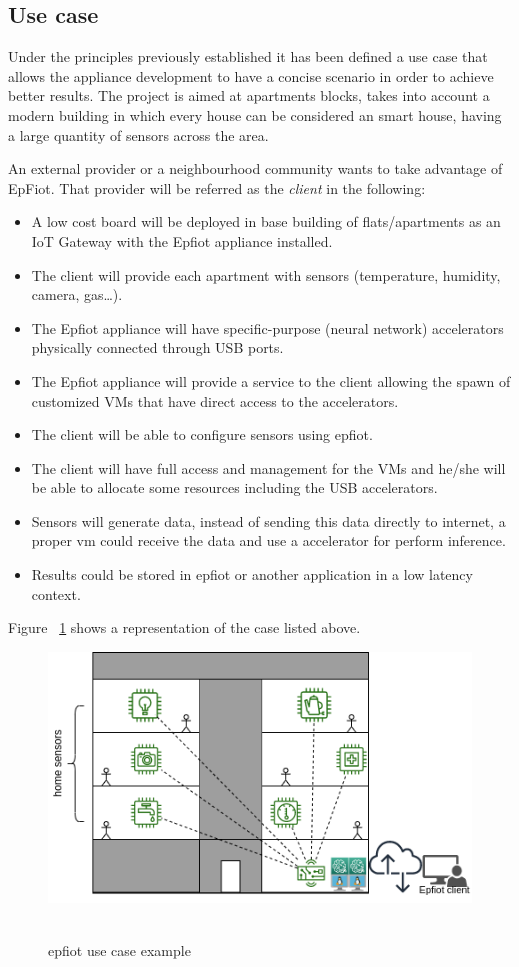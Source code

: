 \subsection{Use case}
\label{makereference1.2.1}
Under the principles previously established it has been defined a use case that allows the appliance development to have a concise scenario in order to achieve better results. The project is aimed at apartments blocks, takes into account a modern building in which every house can be considered an smart house, having a large quantity of sensors across the area.

An external provider or a neighbourhood community wants to take advantage of EpFiot. That provider will be referred as the {\em client} in the following:
\begin{itemize}
  \item A low cost board will be deployed in base building of flats/apartments as an IoT Gateway with the Epfiot appliance installed.
  \item The client will provide each apartment with sensors (temperature, humidity, camera, gas\ldots).
  \item The Epfiot appliance will have specific-purpose (neural network) accelerators physically connected through USB ports.
  \item The Epfiot appliance will provide a service to the client allowing the spawn of customized VMs that have direct access to the accelerators.
  \item The client will be able to configure sensors using epfiot.
  \item The client will have full access and management for the VMs and he/she will be able to allocate some resources including the USB accelerators.
  \item Sensors will generate data, instead of sending this data directly to internet, a proper vm could receive the data and use a accelerator for perform inference.
  \item Results could be stored in epfiot or another application in a low latency context.
\end{itemize}

Figure ~\ref{figure1.2} shows a representation of the case listed above.

\begin{figure}[h]%
    \includegraphics[width=6.5in]{figures/use_case.png}
~\caption{epfiot use case example}
\label{figure1.2}
\end{figure}

